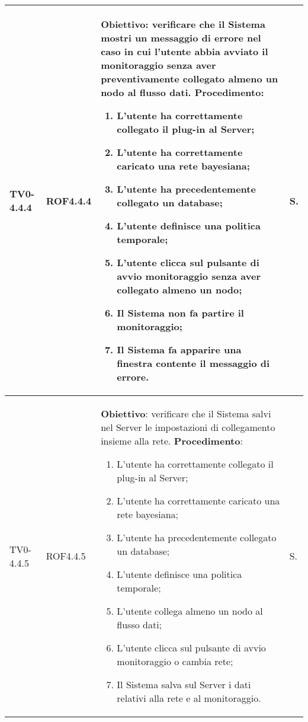 \begin{longtable}{|C{.15\textwidth}|C{.13\textwidth}|m{.65\textwidth}|C{.08\textwidth}|}
TV0-4.4.4 & ROF4.4.4 &
	\textbf{Obiettivo}: verificare che il Sistema mostri un messaggio di errore nel caso in cui l'utente abbia avviato il monitoraggio senza aver preventivamente  collegato almeno un nodo al flusso dati. \newline
	\textbf{Procedimento}:
	\begin{enumerate}
		\item L'utente ha correttamente collegato il plug-in al Server;
		\item L'utente ha correttamente caricato una rete bayesiana;
		\item L'utente ha precedentemente collegato un database;
		\item L'utente definisce una politica temporale;
		\item L'utente clicca sul pulsante di avvio monitoraggio senza aver collegato almeno un nodo;
		\item Il Sistema non fa partire il monitoraggio;
		\item Il Sistema fa apparire una finestra contente il messaggio di errore.
	\end{enumerate}
	& S. \\
\hline

TV0-4.4.5 & ROF4.4.5 &
	\textbf{Obiettivo}: verificare che il Sistema salvi nel Server le impostazioni di collegamento insieme alla rete. \newline
	\textbf{Procedimento}:
	\begin{enumerate}
		\item L'utente ha correttamente collegato il plug-in al Server;
		\item L'utente ha correttamente caricato una rete bayesiana;
		\item L'utente ha precedentemente collegato un database;
		\item L'utente definisce una politica temporale;
		\item L'utente collega almeno un nodo al flusso dati;
		\item L'utente clicca sul pulsante di avvio monitoraggio o cambia rete;
		\item Il Sistema salva sul Server i dati relativi alla rete e al monitoraggio.	
	\end{enumerate}
	& S. \\
\hline


\end{longtable}
